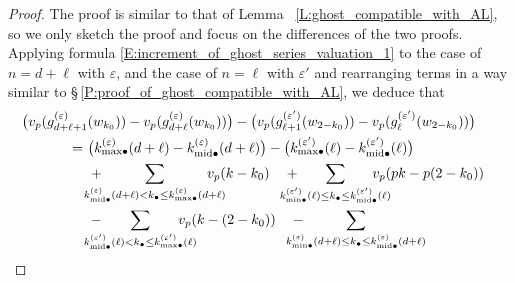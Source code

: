 \begin{proof}
    \label{P:proof_of_ghost_compatible_with_theta}
    The proof is similar to that of Lemma ~\ref{L:ghost_compatible_with_AL}, so we only sketch the proof and focus on the differences of the two proofs.
    Applying formula \eqref{E:increment_of_ghost_series_valuation_1} to the case of $n=d+\ell$ with $\varepsilon$, and the case of $n=\ell$ with $\varepsilon'$ and rearranging terms in a way similar to \S\,\ref{P:proof_of_ghost_compatible_with_AL}, we deduce that
    \begin{align}
    \nonumber
    \big( v_p(g^{(\varepsilon)}_{d+\ell+1}& (w_{k_0}))-v_p(g^{(\varepsilon)}_{d+\ell}(w_{k_0})) \big) - \big( v_p(g^{(\varepsilon')}_{\ell+1}(w_{2-{k_0}}))-v_p(g^{(\varepsilon')}_{\ell}(w_{2-{k_0}})) \big)
    \\
    \label{E:degree_term_theta}
    =\ &\big( k^{(\varepsilon)}_{{\max}\bullet}(d+\ell) - k^{(\varepsilon)}_{{{\mathrm{mid}}}\bullet}(d+\ell) \big)- \big( k^{(\varepsilon')}_{{\max}\bullet}(\ell) - k^{(\varepsilon')}_{{{\mathrm{mid}}}\bullet}(\ell)\big)
    \\
    \label{E:factorial_term_plus_theta}
    &+  \hspace{-15pt}\sum_{
    k^{(\varepsilon)}_{{\mathrm{mid}}\bullet}(d+\ell) < k_\bullet \leq k^{(\varepsilon)}_{{\max}\bullet}(d+\ell)}
    \hspace{-15pt}v_p(k-k_0)\quad + \hspace{-15pt} \sum_{
    k^{(\varepsilon')}_{{\min}\bullet}(\ell) \leq k_\bullet \leq k^{(\varepsilon')}_{{{\mathrm{mid}}}\bullet}(\ell)}
    \hspace{-15pt}v_p(pk-p(2-k_0))\quad
    \\
    \label{E:factorial_term_-_theta}
    &-  \hspace{-15pt} \sum_{
    k^{(\varepsilon')}_{{{\mathrm{mid}}}\bullet}(\ell) < k_\bullet \leq k^{(\varepsilon')}_{{\max}\bullet}(\ell)}
    \hspace{-15pt}v_p(k-(2-k_0))\quad - \hspace{-15pt}\sum_{
    k^{(\varepsilon)}_{{\min}\bullet}(d+\ell) \leq k_\bullet \leq k^{(\varepsilon)}_{{{\mathrm{mid}}}\bullet}(d+\ell)}

\end{align}
\end{proof}

